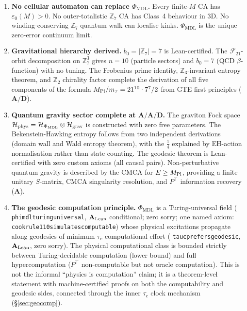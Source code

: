 \documentclass[11pt]{article}
\theoremstyle{remark}
\newcommand{\PHIMDL}{\Phi_{\mathrm{MDL}}}
\newcommand{\ZS}{\mathbb{Z}_7}
\newcommand{\ZZ}{\mathbb{Z}}
\newcommand{\lean}[1]{%
  \penalty-100
  \begingroup\def\_{\textunderscore\allowbreak}\texttt{#1}\endgroup}
\newcommand{\epsz}{\varepsilon_0}
\newcommand{\FTT}{\mathcal{F}_{21}}
\newcommand{\CatA}{\textbf{A}}
\newcommand{\CatAL}{\ensuremath{\textbf{A}_{\rm Lean}}}
\newcommand{\CatAD}{\textbf{A/D}}
\begin{document}
\begin{enumerate}[noitemsep]
\item \textbf{No cellular automaton can replace $\PHIMDL$.}
  Every finite-$M$ CA has $\epsz(M) > 0$.  No outer-totalistic $\ZS$ CA
  has Class~4 behaviour in 3D.  No winding-conserving $\ZS$ quantum walk
  can localise kinks.  $\PHIMDL$ is the unique zero-error continuum limit.

\item \textbf{Gravitational hierarchy derived.}
  $b_0 = |\ZS| = 7$ is Lean-certified.  The $\FTT$-orbit decomposition on
  $\ZS^3$ gives $n=10$ (particle sectors) and $b_0=7$ (QCD $\beta$-function)
  with no tuning.  The Frobenius prime identity, $\ZZ_3$-invariant entropy
  theorem, and $\ZZ_2$ chirality factor complete the derivation of all five
  components of the formula $M_{\rm Pl}/m_\tau = 21^{10}\cdot7^7/2$ from
  GTE first principles ($\CatAD$).

\item \textbf{Quantum gravity sector complete at $\CatA/\CatAD$.}
  The graviton Fock space $\mathcal{H}_{\rm phys}=\mathcal{H}_{\PHIMDL}\otimes
  \mathcal{H}_{\rm grav}$ is constructed with zero free parameters.  The
  Bekenstein-Hawking entropy follows from two independent derivations (domain
  wall and Wald entropy theorem), with the $\tfrac{1}{4}$ explained by
  EH-action normalisation rather than state counting.  The geodesic theorem
  is Lean-certified with zero custom axioms (all causal pairs).  Non-perturbative quantum
  gravity is described by the CMCA for $E\geq M_{\rm Pl}$, providing a finite
  unitary $S$-matrix, CMCA singularity resolution, and $P^\top$ information
  recovery ($\CatA$).

\item \textbf{The geodesic computation principle.}
  $\PHIMDL$ is a Turing-universal field (\lean{phimdl\_turing\_universal},
  $\CatAL$ conditional; zero sorry; one named axiom:
  \lean{cook\_rule110\_simulates\_computable}) whose physical excitations propagate along geodesics
  of minimum $\tau_c$ computational effort
  (\lean{tau\_c\_prefers\_geodesic}, $\CatAL$, zero sorry).
  The physical computational class is bounded strictly between Turing-decidable
  computation (lower bound) and full hypercomputation ($P^\top$ non-computable
  but not oracle computation).  This is not the informal ``physics is computation''
  claim; it is a theorem-level statement with machine-certified proofs on both
  the computability and geodesic sides, connected through the inner $\tau_c$
  clock mechanism (\S\ref{sec:geocomp}).
\end{enumerate}
\end{document}
